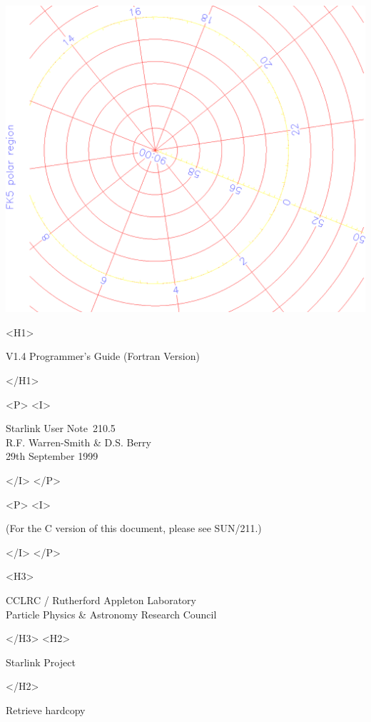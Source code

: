 \documentclass[twoside,11pt]{article}
\newcommand{\stardoccategory}  {Starlink User Note}
\newcommand{\stardocsource}    {sun\stardocnumber}
\newcommand{\stardocnumber}    {210.5}
\newcommand{\stardocauthors}   {R.F. Warren-Smith \& D.S. Berry}
\newcommand{\stardocdate}      {29th September 1999}
\newcommand{\stardocversion}   {V1.4}
\newcommand{\stardocmanualhtml}{Programmer's Guide (Fortran Version)}
\newcommand{\htmladdnormallink}[2]{#1}
\newcommand{\htmladdimg}[1]{}
\newcommand{\xref}[3]{#1}
\begin{document}
\begin{htmlonly}
   \includegraphics[scale=0.3,angle=-90]{sun210_figures/frontc.eps}

   \begin{rawhtml} <H1> \end{rawhtml}
      \stardocversion
      \stardocmanualhtml
   \begin{rawhtml} </H1> \end{rawhtml}
   \begin{rawhtml} <P> <I> \end{rawhtml}
   \stardoccategory\ \stardocnumber \\
   \stardocauthors \\
   \stardocdate
   \begin{rawhtml} </I> </P> \end{rawhtml}
   \begin{rawhtml} <P> <I> \end{rawhtml}
   (For the C version of this document, please see \xref{SUN/211}{sun211}{}.)
   \begin{rawhtml} </I> </P> \end{rawhtml}
   \begin{rawhtml} <H3> \end{rawhtml}
      \htmladdnormallink{CCLRC}{http://www.cclrc.ac.uk} /
      \htmladdnormallink{Rutherford Appleton Laboratory}
                        {http://www.cclrc.ac.uk/ral} \\
      \htmladdnormallink{Particle Physics \& Astronomy Research Council}
                        {http://www.pparc.ac.uk} \\
   \begin{rawhtml} </H3> <H2> \end{rawhtml}
      \htmladdnormallink{Starlink Project}{http://www.starlink.rl.ac.uk/}
   \begin{rawhtml} </H2> \end{rawhtml}
   \htmladdnormallink{\htmladdimg{source.gif} Retrieve hardcopy}
      {http://www.starlink.rl.ac.uk/cgi-bin/hcserver?\stardocsource}\\


\end{htmlonly}
\end{document}

